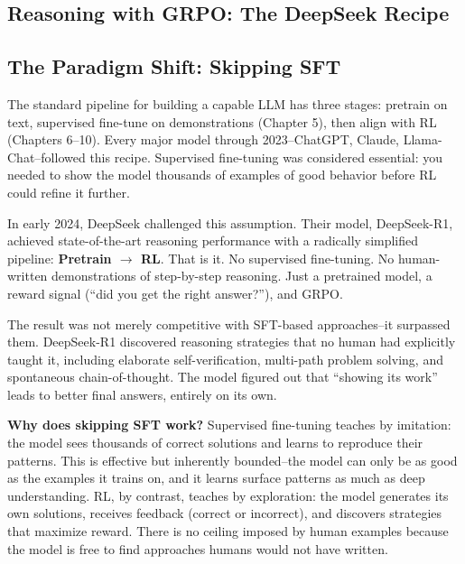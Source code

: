 \begin{chapterenv}

\chapter{Reasoning with GRPO: The DeepSeek Recipe}

\section{The Paradigm Shift: Skipping SFT}

The standard pipeline for building a capable LLM has three stages: pretrain on text, supervised fine-tune on demonstrations (Chapter 5), then align with RL (Chapters 6--10). Every major model through 2023--ChatGPT, Claude, Llama-Chat--followed this recipe. Supervised fine-tuning was considered essential: you needed to show the model thousands of examples of good behavior before RL could refine it further.

In early 2024, DeepSeek challenged this assumption. Their model, DeepSeek-R1, achieved state-of-the-art reasoning performance with a radically simplified pipeline: \textbf{Pretrain $\to$ RL}. That is it. No supervised fine-tuning. No human-written demonstrations of step-by-step reasoning. Just a pretrained model, a reward signal (``did you get the right answer?''), and GRPO.

\begin{tipbox}
The result was not merely competitive with SFT-based approaches--it surpassed them. DeepSeek-R1 discovered reasoning strategies that no human had explicitly taught it, including elaborate self-verification, multi-path problem solving, and spontaneous chain-of-thought. The model figured out that ``showing its work'' leads to better final answers, entirely on its own.
\end{tipbox}

\textbf{Why does skipping SFT work?} Supervised fine-tuning teaches by imitation: the model sees thousands of correct solutions and learns to reproduce their patterns. This is effective but inherently bounded--the model can only be as good as the examples it trains on, and it learns surface patterns as much as deep understanding. RL, by contrast, teaches by exploration: the model generates its own solutions, receives feedback (correct or incorrect), and discovers strategies that maximize reward. There is no ceiling imposed by human examples because the model is free to find approaches humans would not have written.


\end{chapterenv}
